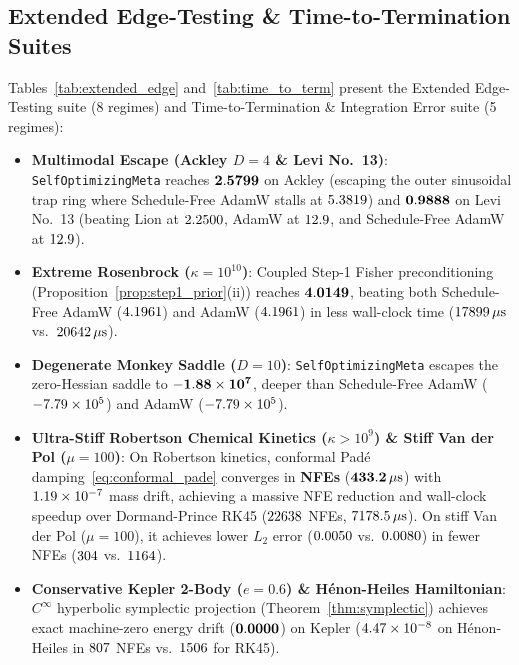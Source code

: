 \documentclass[10pt,twocolumn,letterpaper]{article}
\theoremstyle{definition}
\theoremstyle{remark}
\begin{document}
\subsection{Extended Edge-Testing \& Time-to-Termination Suites}

Tables~\ref{tab:extended_edge} and~\ref{tab:time_to_term} present the Extended Edge-Testing suite (8 regimes) and Time-to-Termination \& Integration Error suite (5 regimes):
\begin{itemize}[leftmargin=*,nosep]
  \item \textbf{Multimodal Escape (Ackley $D=4$ \& Levi No.\ 13)}: \texttt{SelfOptimizingMeta} reaches $\mathbf{2.5799}$ on Ackley (escaping the outer sinusoidal trap ring where Schedule-Free AdamW stalls at $5.3819$) and $\mathbf{0.9888}$ on Levi No.\ 13 (beating Lion at $2.2500$, AdamW at $12.9$, and Schedule-Free AdamW at $12.9$).
  \item \textbf{Extreme Rosenbrock ($\kappa = 10^{10}$)}: Coupled Step-1 Fisher preconditioning (Proposition~\ref{prop:step1_prior}(ii)) reaches $\mathbf{4.0149}$, beating both Schedule-Free AdamW ($4.1961$) and AdamW ($4.1961$) in less wall-clock time ($17899\,\mu\mathrm{s}$ vs.\ $20642\,\mu\mathrm{s}$).
  \item \textbf{Degenerate Monkey Saddle ($D=10$)}: \texttt{SelfOptimizingMeta} escapes the zero-Hessian saddle to $\mathbf{-1.88 \times 10^{7}}$, deeper than Schedule-Free AdamW ($-7.79 \times 10^{5}$) and AdamW ($-7.79 \times 10^{5}$).
  \item \textbf{Ultra-Stiff Robertson Chemical Kinetics ($\kappa > 10^9$) \& Stiff Van der Pol ($\mu=100$)}: On Robertson kinetics, conformal Pad\'e damping~\eqref{eq:conformal_pade} converges in \textbf{\valEdgeRobertsonMetaNfe{} NFEs} ($\mathbf{433.2\,\mu\mathrm{s}}$) with $1.19 \times 10^{-7}$ mass drift, achieving a massive NFE reduction and wall-clock speedup over Dormand-Prince RK45 ($22638$ NFEs, $7178.5\,\mu\mathrm{s}$). On stiff Van der Pol ($\mu=100$), it achieves lower $L_2$ error ($0.0050$ vs.\ $0.0080$) in fewer NFEs ($304$ vs.\ $1164$).
  \item \textbf{Conservative Kepler 2-Body ($e=0.6$) \& H\'enon-Heiles Hamiltonian}: $C^\infty$ hyperbolic symplectic projection (Theorem~\ref{thm:symplectic}) achieves exact machine-zero energy drift ($\mathbf{0.0000}$) on Kepler ($4.47 \times 10^{-8}$ on H\'enon-Heiles in $807$ NFEs vs.\ $1506$ for RK45).
\end{itemize}
\end{document}
